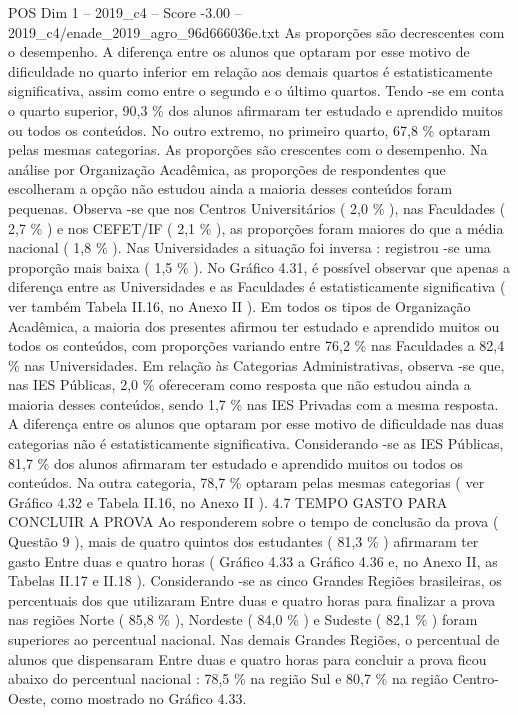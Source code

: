 \begin{textsample}{POS Dim 1 – 2019\_c4 – Score -3.00 – 2019\_c4/enade\_2019\_agro\_96d666036e.txt}
As proporções são decrescentes com o desempenho.
A diferença entre os alunos que optaram por esse motivo de dificuldade no quarto inferior em relação aos demais quartos é estatisticamente significativa, assim como entre o segundo e o último quartos.
Tendo -se em conta o quarto superior, 90,3 \% dos alunos afirmaram ter estudado e aprendido muitos ou todos os conteúdos.
No outro extremo, no primeiro quarto, 67,8 \% optaram pelas mesmas categorias.
As proporções são crescentes com o desempenho.
Na análise por Organização Acadêmica, as proporções de respondentes que escolheram a opção não estudou ainda a maioria desses conteúdos foram pequenas.
Observa -se que nos Centros Universitários ( 2,0 \% ), nas Faculdades ( 2,7 \% ) e nos CEFET/IF ( 2,1 \% ), as proporções foram maiores do que a média nacional ( 1,8 \% ).
Nas Universidades a situação foi inversa : registrou -se uma proporção mais baixa ( 1,5 \% ).
No Gráfico 4.31, é possível observar que apenas a diferença entre as Universidades e as Faculdades é estatisticamente significativa ( ver também Tabela II.16, no Anexo II ).
Em todos os tipos de Organização Acadêmica, a maioria dos presentes afirmou ter estudado e aprendido muitos ou todos os conteúdos, com proporções variando entre 76,2 \% nas Faculdades a 82,4 \% nas Universidades.
Em relação às Categorias Administrativas, observa -se que, nas IES Públicas, 2,0 \% ofereceram como resposta que não estudou ainda a maioria desses conteúdos, sendo 1,7 \% nas IES Privadas com a mesma resposta.
A diferença entre os alunos que optaram por esse motivo de dificuldade nas duas categorias não é estatisticamente significativa.
Considerando -se as IES Públicas, 81,7 \% dos alunos afirmaram ter estudado e aprendido muitos ou todos os conteúdos.
Na outra categoria, 78,7 \% optaram pelas mesmas categorias ( ver Gráfico 4.32 e Tabela II.16, no Anexo II ). 4.7 TEMPO GASTO PARA CONCLUIR A PROVA Ao responderem sobre o tempo de conclusão da prova ( Questão 9 ), mais de quatro quintos dos estudantes ( 81,3 \% ) afirmaram ter gasto Entre duas e quatro horas ( Gráfico 4.33 a Gráfico 4.36 e, no Anexo II, as Tabelas II.17 e II.18 ).
Considerando -se as cinco Grandes Regiões brasileiras, os percentuais dos que utilizaram Entre duas e quatro horas para finalizar a prova nas regiões Norte ( 85,8 \% ), Nordeste ( 84,0 \% ) e Sudeste ( 82,1 \% ) foram superiores ao percentual nacional.
Nas demais Grandes Regiões, o percentual de alunos que dispensaram Entre duas e quatro horas para concluir a prova ficou abaixo do percentual nacional : 78,5 \% na região Sul e 80,7 \% na região Centro-Oeste, como mostrado no Gráfico 4.33.

\end{textsample}
